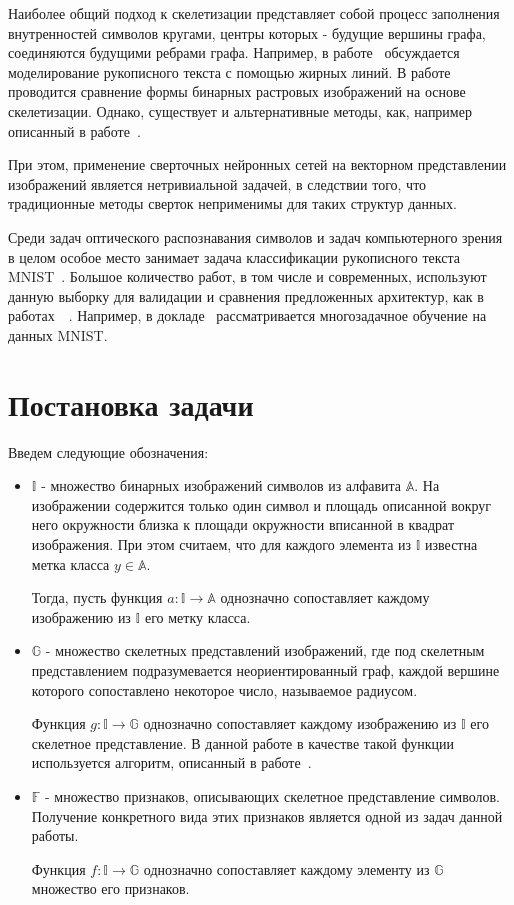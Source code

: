 \documentclass[12pt, twoside]{article}
\begin{document}
Наиболее общий подход к скелетизации представляет собой процесс заполнения внутренностей символов кругами, центры которых - будущие вершины графа, соединяются будущими ребрами графа. Например, в работе~\cite{graphs_gen} обсуждается моделирование рукописного текста с помощью жирных линий. В работе~\cite{graphs_shape_comp} проводится сравнение формы бинарных растровых изображений на основе скелетизации. Однако, существует и альтернативные методы, как, например описанный в работе~\cite{graphs_alt_method}. 

При этом, применение сверточных нейронных сетей на векторном представлении изображений является нетривиальной задачей, в следствии того, что традиционные методы сверток неприменимы для таких структур данных. 

Среди задач оптического распознавания символов и задач компьютерного зрения в целом особое место занимает задача классификации рукописного текста MNIST~\cite{mnist_original}. Большое количество работ, в том числе и современных, используют данную выборку для валидации и сравнения предложенных архитектур, как в работах~\cite{mnist_sample1}~\cite{mnist_sample2}. Например, в докладе~\cite{mnist_sample3} рассматривается многозадачное обучение на данных MNIST.


\section{Постановка задачи}

Введем следующие обозначения: 
\begin{itemize}
\item $\mathbb{I}$ - множество бинарных изображений символов из алфавита $\mathbb{A}$. На изображении содержится только один символ и площадь описанной вокруг него окружности близка к площади окружности вписанной в квадрат изображения. При этом считаем, что для каждого элемента из $\mathbb{I}$ известна метка класса $y \in \mathbb{A}$. 

Тогда, пусть функция $a: \mathbb{I} \rightarrow \mathbb{A}$ однозначно сопоставляет каждому изображению из $\mathbb{I}$ его метку класса.

\item $\mathbb{G}$ - множество скелетных представлений изображений, где под скелетным представлением подразумевается неориентированный граф, каждой вершине которого сопоставлено некоторое число, называемое радиусом.

Функция $g: \mathbb{I} \rightarrow \mathbb{G}$ однозначно сопоставляет каждому изображению из $\mathbb{I}$ его скелетное представление. В данной работе в качестве такой функции используется алгоритм, описанный в работе~\cite{graphs_gen}.

\item $\mathbb{F}$ - множество признаков, описывающих скелетное представление символов. Получение конкретного вида этих признаков является одной из задач данной работы.

Функция $f: \mathbb{I} \rightarrow \mathbb{G}$ однозначно сопоставляет каждому элементу из $\mathbb{G}$ множество его признаков.
\end{itemize}
\end{document}
